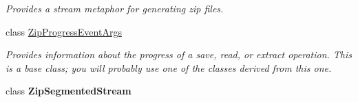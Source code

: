 \begin{DoxyCompactItemize}
\begin{DoxyCompactList}\small\item\em Provides a stream metaphor for generating zip files. \end{DoxyCompactList}\item 
class \mbox{\hyperlink{class_super_tiled2_unity_1_1_ionic_1_1_zip_1_1_zip_progress_event_args}{Zip\+Progress\+Event\+Args}}
\begin{DoxyCompactList}\small\item\em Provides information about the progress of a save, read, or extract operation. This is a base class; you will probably use one of the classes derived from this one. \end{DoxyCompactList}\item 
class {\bfseries Zip\+Segmented\+Stream}
\end{DoxyCompactItemize}
